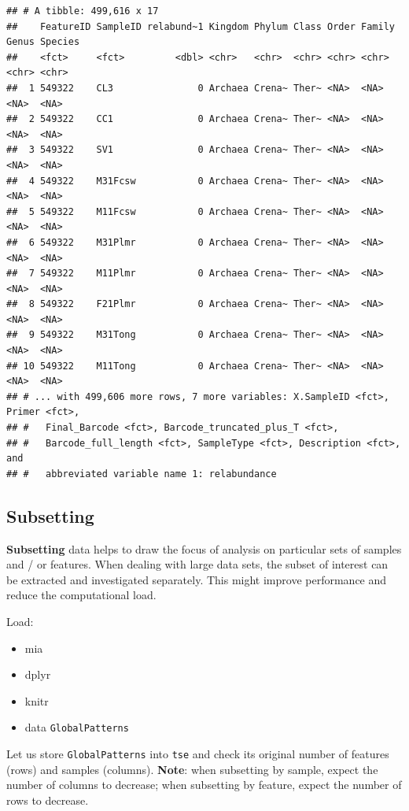 \documentclass[
]{book}
\providecommand{\tightlist}{%
  \setlength{\itemsep}{0pt}\setlength{\parskip}{0pt}}
\begin{document}
\begin{verbatim}
## # A tibble: 499,616 x 17
##    FeatureID SampleID relabund~1 Kingdom Phylum Class Order Family Genus Species
##    <fct>     <fct>         <dbl> <chr>   <chr>  <chr> <chr> <chr>  <chr> <chr>  
##  1 549322    CL3               0 Archaea Crena~ Ther~ <NA>  <NA>   <NA>  <NA>   
##  2 549322    CC1               0 Archaea Crena~ Ther~ <NA>  <NA>   <NA>  <NA>   
##  3 549322    SV1               0 Archaea Crena~ Ther~ <NA>  <NA>   <NA>  <NA>   
##  4 549322    M31Fcsw           0 Archaea Crena~ Ther~ <NA>  <NA>   <NA>  <NA>   
##  5 549322    M11Fcsw           0 Archaea Crena~ Ther~ <NA>  <NA>   <NA>  <NA>   
##  6 549322    M31Plmr           0 Archaea Crena~ Ther~ <NA>  <NA>   <NA>  <NA>   
##  7 549322    M11Plmr           0 Archaea Crena~ Ther~ <NA>  <NA>   <NA>  <NA>   
##  8 549322    F21Plmr           0 Archaea Crena~ Ther~ <NA>  <NA>   <NA>  <NA>   
##  9 549322    M31Tong           0 Archaea Crena~ Ther~ <NA>  <NA>   <NA>  <NA>   
## 10 549322    M11Tong           0 Archaea Crena~ Ther~ <NA>  <NA>   <NA>  <NA>   
## # ... with 499,606 more rows, 7 more variables: X.SampleID <fct>, Primer <fct>,
## #   Final_Barcode <fct>, Barcode_truncated_plus_T <fct>,
## #   Barcode_full_length <fct>, SampleType <fct>, Description <fct>, and
## #   abbreviated variable name 1: relabundance
\end{verbatim}

\hypertarget{subsetting}{%
\subsection{Subsetting}\label{subsetting}}

\textbf{Subsetting} data helps to draw the focus of analysis on particular
sets of samples and / or features. When dealing with large data
sets, the subset of interest can be extracted and investigated
separately. This might improve performance and reduce the
computational load.

Load:

\begin{itemize}
\tightlist
\item
  mia
\item
  dplyr
\item
  knitr
\item
  data \texttt{GlobalPatterns}
\end{itemize}

Let us store \texttt{GlobalPatterns} into \texttt{tse} and check its original number of features (rows) and samples (columns). \textbf{Note}: when subsetting by sample, expect the number of columns to decrease; when subsetting by feature, expect the number of rows to decrease.
\end{document}
